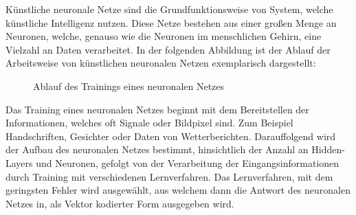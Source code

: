 Künstliche neuronale Netze sind die Grundfunktionsweise von System, welche
künstliche Intelligenz nutzen. Diese Netze bestehen aus einer großen Menge an
Neuronen, welche, genauso wie die Neuronen im menschlichen Gehirn, eine
Vielzahl an Daten verarbeitet. In der folgenden Abbildung ist der Ablauf der
Arbeitsweise von künstlichen neuronalen Netzen exemplarisch dargestellt:

\begin{figure}[h]
    \centering
    
    \caption[width=0.4\textwidth]{Ablauf des Trainings eines neuronalen Netzes}
    \label{fig:trainingneuronalesnetz}
\end{figure}

Das Training eines neuronalen Netzes beginnt mit dem Bereitstellen der
Informationen, welches oft Signale oder Bildpixel sind. Zum Beispiel
Handschriften, Gesichter oder Daten von Wetterberichten. Darauffolgend wird der
Aufbau des neuronalen Netzes bestimmt, hinsichtlich der Anzahl an Hidden-Layers
und Neuronen, gefolgt von der Verarbeitung der Eingangsinformationen durch
Training mit verschiedenen Lernverfahren. Das Lernverfahren, mit dem geringsten
Fehler wird ausgewählt, aus welchem dann die Antwort des neuronalen Netzes in,
als Vektor kodierter Form ausgegeben wird.\cite{dorn2016programmieren}